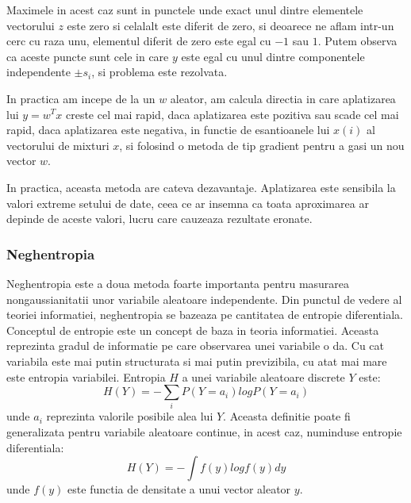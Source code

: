 \documentclass[12pt,oneside]{article}
\begin{document}
Maximele in acest caz sunt in punctele unde exact unul dintre elementele vectorului $z$ este zero si celalalt este diferit de zero, si deoarece ne aflam intr-un cerc cu raza unu, elementul diferit de zero este egal cu $-1$ sau $1$. Putem observa ca aceste puncte sunt cele in care $y$ este egal cu unul dintre componentele independente $\pm s_i$, si problema este rezolvata.

In practica am incepe de la un $w$ aleator, am calcula directia in care aplatizarea lui $y=w^Tx$ creste cel mai rapid, daca aplatizarea este pozitiva sau scade cel mai rapid, daca aplatizarea este negativa, in functie de esantioanele lui $x(i)$ al vectorului de mixturi $x$, si folosind o metoda de tip gradient pentru a gasi un nou vector $w$.

In practica, aceasta metoda are cateva dezavantaje. Aplatizarea este sensibila la valori extreme setului de date, ceea ce ar insemna ca toata aproximarea ar depinde de aceste valori, lucru care cauzeaza rezultate eronate.

\subsubsection{Neghentropia}
Neghentropia este a doua metoda foarte importanta pentru masurarea nongaussianitatii unor variabile aleatoare independente. Din punctul de vedere al teoriei informatiei, neghentropia se bazeaza pe cantitatea de entropie diferentiala. Conceptul de entropie este un concept de baza in teoria informatiei. Aceasta reprezinta gradul de informatie pe care observarea unei variabile o da. Cu cat variabila este mai putin structurata si mai putin previzibila, cu atat mai mare este entropia variabilei. Entropia $H$ a unei variabile aleatoare discrete $Y$ este:
\begin{equation}
	H(Y)=-\sum_i P(Y=a_i)log P(Y=a_i)
\end{equation}
unde $a_i$ reprezinta valorile posibile alea lui $Y$. Aceasta definitie poate fi generalizata pentru variabile aleatoare continue, in acest caz, numinduse entropie diferentiala:
\begin{equation}
H(Y)=-\int f(y) logf(y)dy	
\end{equation}
unde $f(y)$ este functia de densitate a unui vector aleator $y$.
\end{document}
